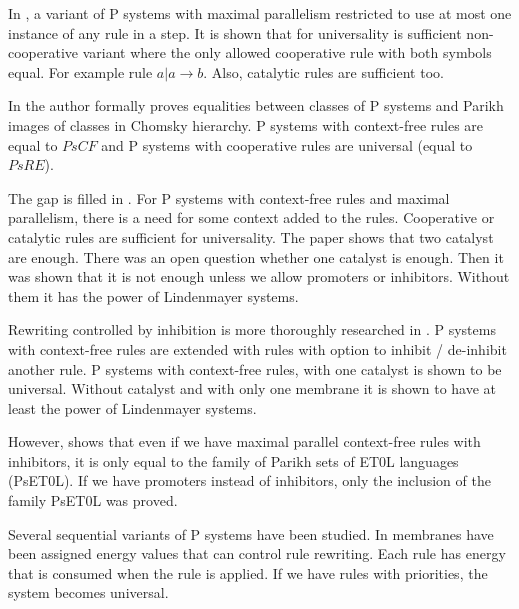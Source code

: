 \documentclass[llncs,submission,copyright,creativecommons]{../lib/lncs/llncs}
\begin{document}

In \cite{Ibarra04dang}, a variant of P systems with maximal parallelism restricted to use at most one instance of any rule in a step. It is shown that for universality is sufficient non-cooperative variant where the only allowed cooperative rule with both symbols equal. For example rule $a|a\rightarrow b$. Also, catalytic rules are sufficient too.


In \cite{Sburlan05dragos} the author formally proves equalities between classes of P systems and Parikh images of classes in Chomsky hierarchy. P systems with context-free rules are equal to $PsCF$ and P systems with cooperative rules are universal (equal to $PsRE$).


The gap is filled in \cite{Ionescu:jucs_10_5:on_p_systems_with}. For P systems with context-free rules and maximal parallelism, there is a need for some context added to the rules. Cooperative or catalytic rules are sufficient for universality. The paper shows that two catalyst are enough. There was an open question whether one catalyst is enough. Then it was shown that it is not enough unless we allow promoters or inhibitors. Without them it has the power of Lindenmayer systems.


Rewriting controlled by inhibition is more thoroughly researched in \cite{Cavaliere:2004:IRP:2144633.2144648}. P systems with context-free rules are extended with rules with option to inhibit / de-inhibit another rule. P systems with context-free rules, with one catalyst is shown to be universal. Without catalyst and with only one membrane it is shown to have at least the power of Lindenmayer systems.


However, \cite{doi:10.1142/S0129054106003772} shows that even if we have maximal parallel context-free rules with inhibitors, it is only equal to the family of Parikh sets of ET0L languages (PsET0L). If we have promoters instead of inhibitors, only the inclusion of the family PsET0L was proved. %


Several sequential variants of P systems have been studied. In \cite{Freund:2004:SPS:2149813.2149831} membranes have been assigned energy values that can control rule rewriting. Each rule has energy that is consumed when the rule is applied. If we have rules with priorities, the system becomes universal.
\end{document}
